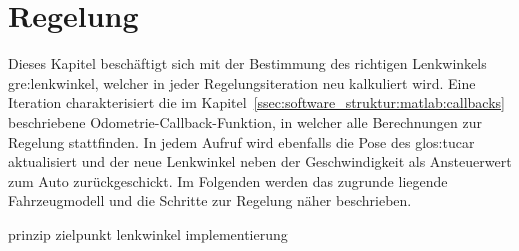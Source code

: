 \chapter{Regelung \dcfirstauthorshort}
\label{cha:regelung}

Dieses Kapitel beschäftigt sich mit der Bestimmung des richtigen Lenkwinkels \gls{gre:lenkwinkel}, welcher in jeder Regelungsiteration neu kalkuliert wird. Eine Iteration charakterisiert die im Kapitel~\ref{ssec:software_struktur:matlab:callbacks} beschriebene Odometrie-Callback-Funktion, in welcher alle Berechnungen zur Regelung stattfinden. In jedem Aufruf wird ebenfalls die Pose des \gls{glos:tucar} aktualisiert und der neue Lenkwinkel neben der Geschwindigkeit als Ansteuerwert zum Auto zurückgeschickt. Im Folgenden werden das zugrunde liegende Fahrzeugmodell und die Schritte zur Regelung näher beschrieben. 

{prinzip}
{zielpunkt}
{lenkwinkel}
{implementierung}

